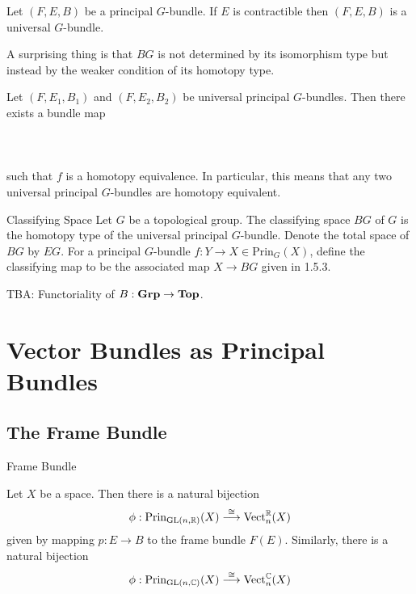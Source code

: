 \documentclass[a4paper]{article}
\begin{document}
\begin{thm}{}{} Let $(F,E,B)$ be a principal $G$-bundle. If $E$ is contractible then $(F,E,B)$ is a universal $G$-bundle. 
\end{thm}

A surprising thing is that $BG$ is not determined by its isomorphism type but instead by the weaker condition of its homotopy type. 

\begin{thm}{}{} Let $(F,E_1,B_1)$ and $(F,E_2,B_2)$ be universal principal $G$-bundles. Then there exists a bundle map \\~\\
\\~\\
such that $f$ is a homotopy equivalence. In particular, this means that any two universal principal $G$-bundles are homotopy equivalent. 
\end{thm}

\begin{defn}{Classifying Space}{} Let $G$ be a topological group. The classifying space $BG$ of $G$ is the homotopy type of the universal principal $G$-bundle. Denote the total space of $BG$ by $EG$. For a principal $G$-bundle $f:Y\to X\in\text{Prin}_G(X)$, define the classifying map to be the associated map $X\to BG$ given in 1.5.3. 
\end{defn}

TBA: Functoriality of $B:\bold{Grp}\to\bold{Top}$. 

\pagebreak
\section{Vector Bundles as Principal Bundles}
\subsection{The Frame Bundle}
\begin{defn}{Frame Bundle}{}
\end{defn}

\begin{thm}{}{} Let $X$ be a space. Then there is a natural bijection $$\phi:\text{Prin}_{\text{GL}(n,\mathbb{R})}(X)\overset{\cong}{\longrightarrow}\text{Vect}_n^{\mathbb{R}}(X)$$ given by mapping $p:E\to B$ to the frame bundle $F(E)$. Similarly, there is a natural bijection $$\phi:\text{Prin}_{\text{GL}(n,\mathbb{C})}(X)\overset{\cong}{\longrightarrow}\text{Vect}_n^{\mathbb{C}}(X)$$
\end{thm}
\end{document}
